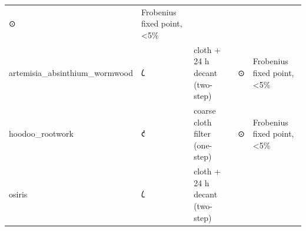\begin{longtable}[]{@{}lllll@{}}
\begin{minipage}[t]{0.17\columnwidth}
⊙\strut
\end{minipage} & \begin{minipage}[t]{0.17\columnwidth}\raggedright
Frobenius fixed point, \textless5\%\strut
\end{minipage}\tabularnewline
\begin{minipage}[t]{0.17\columnwidth}\raggedright
artemisia\_absinthium\_wormwood\strut
\end{minipage} & \begin{minipage}[t]{0.17\columnwidth}\raggedright
𐑖\strut
\end{minipage} & \begin{minipage}[t]{0.17\columnwidth}\raggedright
cloth + 24 h decant (two-step)\strut
\end{minipage} & \begin{minipage}[t]{0.17\columnwidth}\raggedright
⊙\strut
\end{minipage} & \begin{minipage}[t]{0.17\columnwidth}\raggedright
Frobenius fixed point, \textless5\%\strut
\end{minipage}\tabularnewline
\begin{minipage}[t]{0.17\columnwidth}\raggedright
hoodoo\_rootwork\strut
\end{minipage} & \begin{minipage}[t]{0.17\columnwidth}\raggedright
𐑒\strut
\end{minipage} & \begin{minipage}[t]{0.17\columnwidth}\raggedright
coarse cloth filter (one-step)\strut
\end{minipage} & \begin{minipage}[t]{0.17\columnwidth}\raggedright
⊙\strut
\end{minipage} & \begin{minipage}[t]{0.17\columnwidth}\raggedright
Frobenius fixed point, \textless5\%\strut
\end{minipage}\tabularnewline
\begin{minipage}[t]{0.17\columnwidth}\raggedright
osiris\strut
\end{minipage} & \begin{minipage}[t]{0.17\columnwidth}\raggedright
𐑖\strut
\end{minipage} & \begin{minipage}[t]{0.17\columnwidth}\raggedright
cloth + 24 h decant (two-step)\strut
\end{minipage} & \begin{minipage}[t]{0.17\columnwidth}\raggedright

\end{minipage}
\end{longtable}
